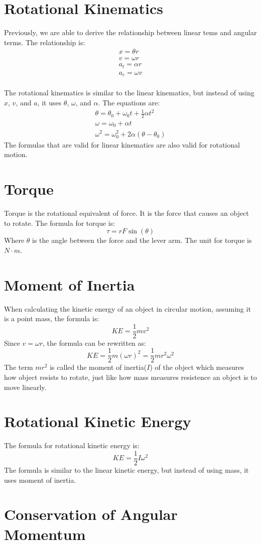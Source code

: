 \documentclass[]{article}
\begin{document}
    \section{Rotational Kinematics}
        Previously, we are able to derive the relationship between linear
        tems and angular terms. The relationship is:
        \begin{gather*}
            x = \theta r\\
            v = \omega r\\
            a_t = \alpha r\\
            a_c = \omega v\\
        \end{gather*}

        The rotational kinematics is similar to the linear kinematics, but
        instead of using $x$, $v$, and $a$, it uses $\theta$, $\omega$, and
        $\alpha$. The equations are:
        \begin{gather*}
            \theta = \theta_0 + \omega_0 t + \frac{1}{2} \alpha t^2\\
            \omega = \omega_0 + \alpha t\\
            \omega^2 = \omega_0^2 + 2\alpha(\theta - \theta_0)
        \end{gather*}
        The formulas that are valid for linear kinematics are also valid for
        rotational motion.
    \section{Torque}

        Torque is the rotational equivalent of force. It is the force that
        causes an object to rotate. The formula for torque is:
        \[\tau = r F \sin(\theta)\]
        Where $\theta$ is the angle between the force and the lever arm. The
        unit for torque is $N \cdot m$.
    \section{Moment of Inertia}
    When calculating the kinetic energy of an object in circular motion,
    assuming it is a point mass, the formula is:
        \[KE = \frac{1}{2}mv^2\]
    Since $v = \omega r$, the formula can be rewritten as:
        \[KE = \frac{1}{2}m(\omega r)^2 = \frac{1}{2}m r^2 \omega^2\]
    The term $mr^2$ is called the moment of inertia($I$) of the object which
    measures how object resists to rotate, just like how mass measures
    resistence an object is to move linearly.
    \section{Rotational Kinetic Energy}
    The formula for rotational kinetic energy is:
        \[KE = \frac{1}{2} I \omega^2\]
    The formula is similar to the linear kinetic energy, but instead of using
    mass, it uses moment of inertia.
    \section{Conservation of Angular Momentum}
\end{document}
